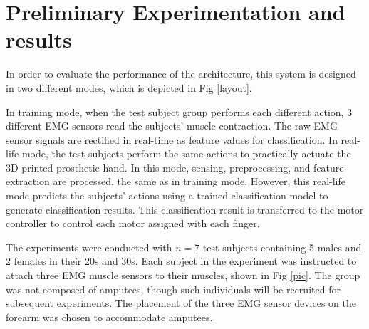 \chapter{Preliminary Experimentation and results}

In order to evaluate the performance of the architecture, this system
is designed in two different modes, which is depicted in Fig
\ref{layout}.



In training mode, when the test subject group performs each different
action, 3 different EMG sensors read the subjects' muscle
contraction. The raw EMG sensor signals are rectified in real-time as
feature values for classification.  In real-life mode, the test
subjects perform the same actions to practically actuate the 3D
printed prosthetic hand. In this mode, sensing, preprocessing, and
feature extraction are processed, the same as in training
mode. However, this real-life mode predicts the subjects' actions
using a trained classification model to generate classification
results. This classification result is transferred to the motor
controller to control each motor assigned with each finger.

The experiments were conducted with $n=7$ test subjects containing 5
males and 2 females in their 20s and 30s. Each subject in the
experiment was instructed to attach three EMG muscle sensors to their
muscles, shown in Fig \ref{pic}.  The group was not composed of
amputees, though such individuals will be recruited for subsequent
experiments.  The placement of the three EMG sensor devices on the
forearm was chosen to accommodate amputees.



